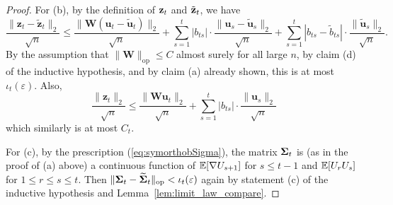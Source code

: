 \documentclass[10pt,reqno]{amsart}
\def\op{\mathrm{op}}
\def\bW{{\mathbf{W}}}
\def\bu{{\mathbf{u}}}
\def\bz{{\mathbf{z}}}
\def\eps{\varepsilon}
\begin{document}
\begin{proof}
For (b), by the definition of $\mathbf{z}_t$ and $\tilde{\mathbf{z}}_t$, we have
\[\frac{\|\bz_t - \tilde{\bz}_t\|_2}{\sqrt{n}} \leq 
\frac{\|\bW (\bu_t - \tilde{\bu}_t)\|_2}{\sqrt{n}} 
+ \sum_{s=1}^t |b_{ts}| \cdot \frac{\|\bu_s - \tilde\bu_s\|_2}{\sqrt{n}}
+ \sum_{s=1}^t |b_{ts} - \tilde{b}_{ts}| 
\cdot \frac{\|\tilde\bu_s\|_2}{\sqrt{n}}.\]
By the assumption that $\|\bW\|_\op \leq C$ almost surely for all large $n$,
by claim (d) of the inductive hypothesis, and by claim (a) already shown,
this is at most $\iota_t(\eps)$. Also,
\[\frac{\|\bz_t\|_2}{\sqrt{n}} \leq 
\frac{\|\bW \bu_t\|_2}{\sqrt{n}} 
+ \sum_{s=1}^t |b_{ts}| \cdot \frac{\|\bu_s\|_2}{\sqrt{n}}\]
which similarly is at most $C_t$.

For (c), by the prescription (\ref{eq:symorthobSigma}), the matrix $\bm{\Sigma}_t$ is
(as in the proof of (a) above) a continuous function of
$\mathbb{E}[\nabla U_{s+1}]$ for $s \leq t-1$ 
and $\mathbb{E}[U_r U_s]$ for $1 \leq r \leq s \leq t$. Then $\|\bSigma_t-\widetilde
\bSigma_t\|_\op<\iota_t(\eps)$ again by statement (c) of the
inductive hypothesis and Lemma~\ref{lem:limit_law_compare}.


\end{proof}
\end{document}
